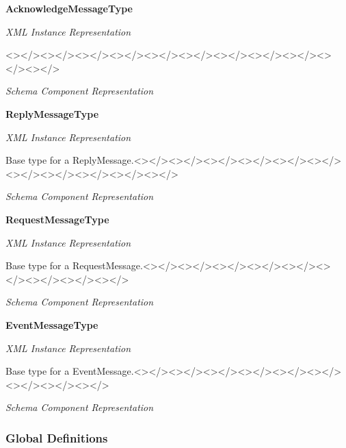    \bf{} AcknowledgeMessageType
    
    \emph{XML Instance Representation}
    
    <></><></><></><></><></><></><></><></><></><></><></>

    \emph{Schema Component Representation}
    
    

    \bf{} ReplyMessageType
    
    \emph{XML Instance Representation}
    
    Base type for a ReplyMessage.<></><></><></><></><></><></><></><></><></><></><></>

    \emph{Schema Component Representation}
    
    

    \bf{} RequestMessageType
    
    \emph{XML Instance Representation}
    
    Base type for a RequestMessage.<></><></><></><></><></><></><></><></><></>

    \emph{Schema Component Representation}
    
    

    \bf{} EventMessageType
    
    \emph{XML Instance Representation}
    
    Base type for a EventMessage.<></><></><></><></><></><></><></><></><></>

    \emph{Schema Component Representation}
    
    

    \subsubsection{Global Definitions}

  